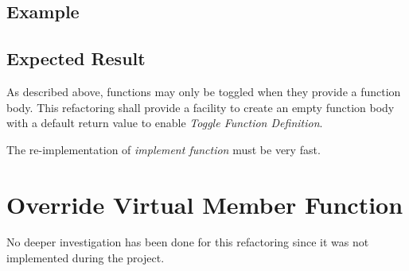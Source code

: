 \subsection*{Example}


\subsection{Expected Result}
As described above, functions may only be toggled when they provide a function 
body. This refactoring shall provide a facility to create an empty function body 
with a default return value to enable \textit{Toggle Function Definition}.

The re-implementation of \textit{implement function} must be very fast. 

\section{Override Virtual Member Function}

No deeper investigation has been done for this refactoring since it was not 
implemented during the project.
